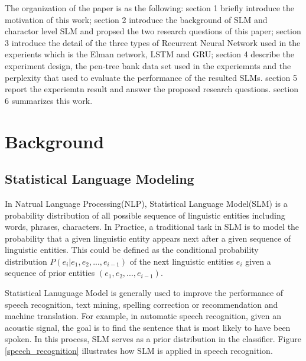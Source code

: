 \documentclass[]{article}
\begin{document}
The organization of the paper is as the following: section 1 briefly introduce the motivation of this work; 
section 2 introduce the background of SLM and charactor level SLM and propsed the two research questions of this paper; 
section 3 introduce the detail of the three types of Recurrent Neural Network used in the experients which is the Elman network, LSTM and GRU;
section 4 describe the experiment design, the pen-tree bank data set used in the experiemnts and the perplexity that used to evaluate the performance of the resulted SLMs.
section 5 report the experiemtn result and answer the proposed research questions.
section 6 summarizes this work. 






\section{Background}


\subsection{Statistical Language Modeling}
In Natrual Language Processing(NLP), Statistical Language Model(SLM) is a probability distribution  of all possible sequence of linguistic  entities including words, phrases, characters\cite{rosenfeld2000two}. 
In Practice, a traditional task in SLM is to model the probability that a given linguistic  entity appears next after a given sequence of linguistic  entities. 
This could be defined as the conditional probability distribution $P(e_i| e_1,e_2,...,e_{i-1})$ of the next linguistic entities $e_i$ given a sequence of prior entities $(e_1,e_2,...,e_{i-1})$. 

Statistical Lanuguage Model is generally used to improve the performance of speech recognition, text mining, spelling correction or recommendation and machine translation. 
For example, in automatic speech recognition, given an acoustic signal, the goal is to find the sentence that is most likely to have been spoken. 
In this process, SLM serves as a prior distribution in the classifier.
Figure \ref{speech_recognition} illustrates how SLM is applied in speech recognition.
\end{document}
